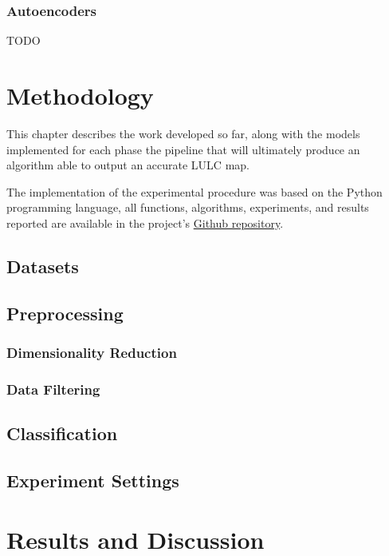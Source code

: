 \documentclass[12pt, english, openany]{book}
\begin{document}
\subsection*{Autoencoders}
TODO

\chapter{Methodology}

This chapter describes the work developed so far, along with the models implemented for each phase the pipeline that will ultimately produce an algorithm able to output an accurate LULC map.

The implementation of the experimental procedure was based on the Python programming language, all functions, algorithms, experiments, and results reported are available in the project's \textcolor{blue}{\href{https://github.com/joaopfonseca/remote_sensing}{Github repository}}.

\section{Datasets}

\section{Preprocessing}

\subsection{Dimensionality Reduction}

\subsection{Data Filtering}

\section{Classification}

\section{Experiment Settings}

\chapter{Results and Discussion}





\end{document}
